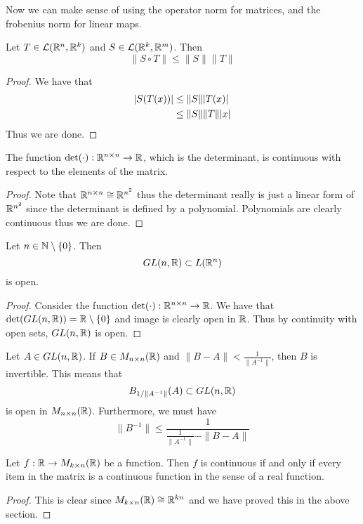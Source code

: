 \documentclass[a4paper]{article}
\begin{document}
Now we can make sense of using the operator norm for matrices, and the frobenius norm for linear maps. 

\begin{prp}{}{} Let $T\in\mathcal{L}(\mathbb{R}^n,\mathbb{R}^k)$ and $S\in\mathcal{L}(\mathbb{R}^k,\mathbb{R}^m)$. Then $$\|S\circ T\|\leq\|S\|\|T\|$$ 
\begin{proof}
We have that 
\begin{align*}
\abs{S(T(x))}&\leq\|S\|\abs{T(x)}\\
&\leq\|S\|\|T\|\abs{x}
\end{align*}
Thus we are done. 
\end{proof}
\end{prp}

\begin{prp}{}{} The function $\det(\cdot):\mathbb{R}^{n\times n}\to\mathbb{R}$, which is the determinant, is continuous with respect to the elements of the matrix. 
\begin{proof}
Note that $\mathbb{R}^{n\times n}\cong\mathbb{R}^{n^2}$ thus the determinant really is just a linear form of $\mathbb{R}^{n^2}$ since the determinant is defined by a polynomial. Polynomials are clearly continuous thus we are done. 
\end{proof}
\end{prp}

\begin{prp}{}{} Let $n\in\mathbb{N}\setminus\{0\}$. Then $$GL(n,\mathbb{R})\subset L(\mathbb{R}^n)$$ is open. 
\begin{proof}
Consider the function $\det(\cdot):\mathbb{R}^{n\times n}\to\mathbb{R}$. We have that $\det(GL(n,\mathbb{R}))=\mathbb{R}\setminus\{0\}$ and image is clearly open in $\mathbb{R}$. Thus by continuity with open sets, $GL(n,\mathbb{R})$ is open. 
\end{proof}
\end{prp}

\begin{prp}{}{} Let $A\in GL(n,\mathbb{R})$. If $B\in M_{n\times n}(\mathbb{R})$ and $\|B-A\|<\frac{1}{\|A^{-1}\|}$, then $B$ is invertible. This means that $$B_{1/\|A^{-1}\|}(A)\subset GL(n,\mathbb{R})$$ is open in $M_{n\times n}(\mathbb{R})$. Furthermore, we must have $$\|B^{-1}\|\leq\frac{1}{\frac{1}{\|A^{-1}\|}-\|B-A\|}$$
\end{prp}

\begin{prp}{}{} Let $f:\mathbb{R}\to M_{k\times n}(\mathbb{R})$ be a function. Then $f$ is continuous if and only if every item in the matrix is a continuous function in the sense of a real function. 
\begin{proof}
This is clear since $M_{k\times n}(\mathbb{R})\cong\mathbb{R}^{kn}$ and we have proved this in the above section. 
\end{proof}
\end{prp}
\end{document}
